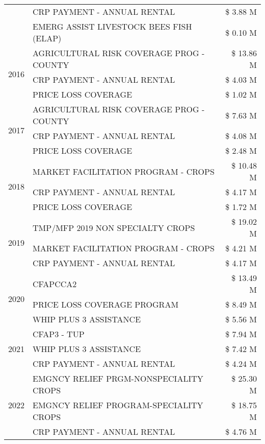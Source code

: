 \begin{tabular}{llr}
 & CRP PAYMENT - ANNUAL RENTAL & \$ 3.88 M \\
 & EMERG ASSIST LIVESTOCK BEES FISH (ELAP) & \$ 0.10 M \\
\cline{1-3}
\multirow[t]{3}{*}{2016} & AGRICULTURAL RISK COVERAGE PROG - COUNTY & \$ 13.86 M \\
 & CRP PAYMENT - ANNUAL RENTAL & \$ 4.03 M \\
 & PRICE LOSS COVERAGE & \$ 1.02 M \\
\cline{1-3}
\multirow[t]{3}{*}{2017} & AGRICULTURAL RISK COVERAGE PROG - COUNTY & \$ 7.63 M \\
 & CRP PAYMENT - ANNUAL RENTAL & \$ 4.08 M \\
 & PRICE LOSS COVERAGE & \$ 2.48 M \\
\cline{1-3}
\multirow[t]{3}{*}{2018} & MARKET FACILITATION PROGRAM - CROPS & \$ 10.48 M \\
 & CRP PAYMENT - ANNUAL RENTAL & \$ 4.17 M \\
 & PRICE LOSS COVERAGE & \$ 1.72 M \\
\cline{1-3}
\multirow[t]{3}{*}{2019} & TMP/MFP 2019 NON SPECIALTY CROPS & \$ 19.02 M \\
 & MARKET FACILITATION PROGRAM - CROPS & \$ 4.21 M \\
 & CRP PAYMENT - ANNUAL RENTAL & \$ 4.17 M \\
\cline{1-3}
\multirow[t]{3}{*}{2020} & CFAPCCA2 & \$ 13.49 M \\
 & PRICE LOSS COVERAGE PROGRAM & \$ 8.49 M \\
 & WHIP PLUS 3 ASSISTANCE & \$ 5.56 M \\
\cline{1-3}
\multirow[t]{3}{*}{2021} & CFAP3 - TUP & \$ 7.94 M \\
 & WHIP PLUS 3 ASSISTANCE & \$ 7.42 M \\
 & CRP PAYMENT - ANNUAL RENTAL & \$ 4.24 M \\
\cline{1-3}
\multirow[t]{3}{*}{2022} & EMGNCY RELIEF PRGM-NONSPECIALITY CROPS & \$ 25.30 M \\
 & EMGNCY RELIEF PROGRAM-SPECIALITY CROPS & \$ 18.75 M \\
 & CRP PAYMENT - ANNUAL RENTAL & \$ 4.76 M \\
\cline{1-3}
\bottomrule
\end{tabular}
